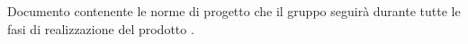 Documento contenente le norme di progetto che il gruppo \gruppo seguirà durante tutte le fasi di realizzazione del prodotto \progetto.

